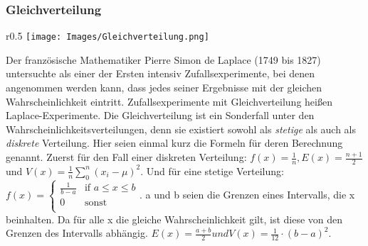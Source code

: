\documentclass{scrreprt}
\begin{document}
\subsubsection{Gleichverteilung}\label{Gleichverteilung}
\begin{wrapfigure}{r}{0.5\textwidth}
    \centering
    \texttt{[image: Images/Gleichverteilung.png]}
    \caption{}
    \label{Figur 8}
\end{wrapfigure}
Der französische Mathematiker Pierre Simon de Laplace (1749 bis 1827) untersuchte als einer der Ersten intensiv Zufallsexperimente, bei denen angenommen werden kann, dass jedes seiner Ergebnisse mit der gleichen Wahrscheinlichkeit eintritt. Zufallsexperimente mit Gleichverteilung heißen Laplace-Experimente. Die Gleichverteilung ist ein Sonderfall unter den Wahrscheinlichkeitsverteilungen, denn sie existiert sowohl als \textit{stetige} als auch als \textit{diskrete} Verteilung. Hier seien einmal kurz die Formeln für deren Berechnung genannt. Zuerst für den Fall einer diskreten Verteilung:
$f(x)=\frac{1}{n}, E(x)=\frac{n+1}{2}$ und $V(x)=\frac{1}{n}\sum_{0}^{n}(x_i-\mu)^2$. Und für eine stetige Verteilung: 
$f(x)=
\begin{cases}
    \frac{1}{b-a} & \text{if } a \leq x \leq b \\
    0 & \text{sonst} \\
\end{cases}$. a und b seien die Grenzen eines Intervalls, die x beinhalten. Da für alle x die gleiche Wahrscheinlichkeit gilt, ist diese von den Grenzen des Intervalls abhängig. $E(x)=\frac{a+b}{2} und V(x)=\frac{1}{12}\cdot (b-a)^2$.
\end{document}
